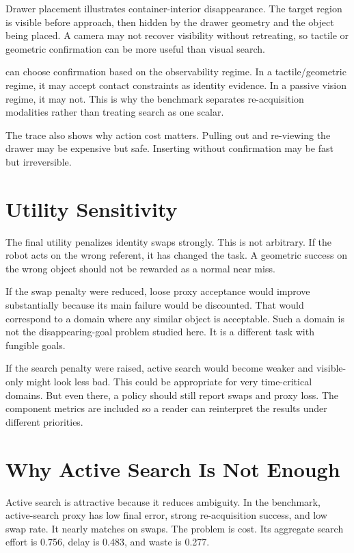 Drawer placement illustrates container-interior disappearance. The target region is visible before approach, then hidden by the drawer geometry and the object being placed. A camera may not recover visibility without retreating, so tactile or geometric confirmation can be more useful than visual search.

\method can choose confirmation based on the observability regime. In a tactile/geometric regime, it may accept contact constraints as identity evidence. In a passive vision regime, it may not. This is why the benchmark separates re-acquisition modalities rather than treating search as one scalar.

The trace also shows why action cost matters. Pulling out and re-viewing the drawer may be expensive but safe. Inserting without confirmation may be fast but irreversible.

\section{Utility Sensitivity}

The final utility penalizes identity swaps strongly. This is not arbitrary. If the robot acts on the wrong referent, it has changed the task. A geometric success on the wrong object should not be rewarded as a normal near miss.

If the swap penalty were reduced, loose proxy acceptance would improve substantially because its main failure would be discounted. That would correspond to a domain where any similar object is acceptable. Such a domain is not the disappearing-goal problem studied here. It is a different task with fungible goals.

If the search penalty were raised, active search would become weaker and visible-only might look less bad. This could be appropriate for very time-critical domains. But even there, a policy should still report swaps and proxy loss. The component metrics are included so a reader can reinterpret the results under different priorities.

\section{Why Active Search Is Not Enough}

Active search is attractive because it reduces ambiguity. In the benchmark, active-search proxy has low final error, strong re-acquisition success, and low swap rate. It nearly matches \method on swaps. The problem is cost. Its aggregate search effort is 0.756, delay is 0.483, and waste is 0.277.

